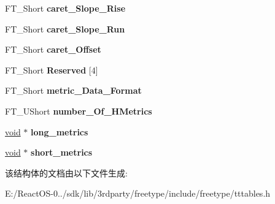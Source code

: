 \begin{DoxyCompactItemize}
\item 
\mbox{\label{struct_t_t___hori_header___aeb43d92f56de424d8f28bd389973eca4}} 
F\+T\+\_\+\+Short {\bfseries caret\+\_\+\+Slope\+\_\+\+Rise}
\item 
\mbox{\label{struct_t_t___hori_header___acce162ae0554006c11a3383bd3454d69}} 
F\+T\+\_\+\+Short {\bfseries caret\+\_\+\+Slope\+\_\+\+Run}
\item 
\mbox{\label{struct_t_t___hori_header___a791ad767d54cc87e84d9b03d6739f0eb}} 
F\+T\+\_\+\+Short {\bfseries caret\+\_\+\+Offset}
\item 
\mbox{\label{struct_t_t___hori_header___af2a2b374d8f81771fb75d3bdc96bcbf7}} 
F\+T\+\_\+\+Short {\bfseries Reserved} \mbox{[}4\mbox{]}
\item 
\mbox{\label{struct_t_t___hori_header___a0ed857e9629d2dfb5350a6b5976bf933}} 
F\+T\+\_\+\+Short {\bfseries metric\+\_\+\+Data\+\_\+\+Format}
\item 
\mbox{\label{struct_t_t___hori_header___aac3ecb9ba7c13436a663b91765e89647}} 
F\+T\+\_\+\+U\+Short {\bfseries number\+\_\+\+Of\+\_\+\+H\+Metrics}
\item 
\mbox{\label{struct_t_t___hori_header___a3eeb5766b461e9563b659a30e775fcc2}} 
\hyperlink{interfacevoid}{void} $\ast$ {\bfseries long\+\_\+metrics}
\item 
\mbox{\label{struct_t_t___hori_header___ae39107c4cfc3e7c1871dbb304bbe4a5a}} 
\hyperlink{interfacevoid}{void} $\ast$ {\bfseries short\+\_\+metrics}
\end{DoxyCompactItemize}


该结构体的文档由以下文件生成\+:\begin{DoxyCompactItemize}
\item 
E\+:/\+React\+O\+S-\/0../sdk/lib/3rdparty/freetype/include/freetype/tttables.\+h\end{DoxyCompactItemize}
